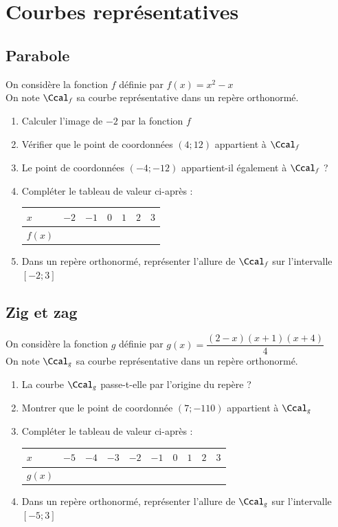 \documentclass[oneside,12pt]{article}          			%
\begin{document}
\section{Courbes représentatives}

\subsection{Parabole}
On considère la fonction $f$ définie par $f(x)=x^2-x$ \\
On note $\Ccal_f$ sa courbe représentative dans un repère orthonormé.
\begin{enumerate}
	\item Calculer l'image de $-2$ par la fonction $f$
	\item Vérifier que le point de coordonnées $(4;12)$ appartient à $\Ccal_f$
	\item Le point de coordonnées $(-4;-12)$ appartient-il également à $\Ccal_f$ ?
	\item Compléter le tableau de valeur ci-après :
	\begin{center}
		\renewcommand{\arraystretch}{2}
		\begin{tabular}{|P{1.5cm}|P{1.5cm}|P{1.5cm}|P{1.5cm}|P{1.5cm}|P{1.5cm}|P{1.5cm}|} \hline
			$x$ & $-2$ & $-1$ & $0$ & $1$ & $2$ & $3$ \\ \hline
			$f(x)$ & & & & & & \\ \hline	
		\end{tabular}
	\end{center}
	\item Dans un repère orthonormé, représenter l'allure de $\Ccal_f$ sur l'intervalle $[-2;3]$
\end{enumerate}



\subsection{Zig et zag}
On considère la fonction $g$ définie par $g(x)=\dfrac{(2-x)(x+1)(x+4)}{4}$ \\
On note $\Ccal_g$ sa courbe représentative dans un repère orthonormé.
\begin{enumerate}
	\item La courbe $\Ccal_g$ passe-t-elle par l'origine du repère ?
	\item Montrer que le point de coordonnée $(7;-110)$ appartient à $\Ccal_g$
	\item Compléter le tableau de valeur ci-après :
	\begin{center}
		\renewcommand{\arraystretch}{2}
		\begin{tabular}{|P{1cm}|P{1cm}|P{1cm}|P{1cm}|P{1cm}|P{1cm}|P{1cm}|P{1cm}|P{1cm}|P{1cm}|} \hline
			$x$ & $-5$ & $-4$ & $-3$ & $-2$ & $-1$ & $0$ & $1$ & $2$ & $3$ \\ \hline
			$g(x)$ & & & & & & & & & \\ \hline	
		\end{tabular}
	\end{center}
	\item Dans un repère orthonormé, représenter l'allure de $\Ccal_g$ sur l'intervalle $[-5;3]$
\end{enumerate}
\end{document}
